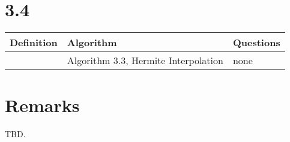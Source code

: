 \documentclass{article}
\begin{document}
\section*{3.4}

\begin{tabularx}{\textwidth}{ |X|X|X| }
    \hline
	{\bf Definition} & {\bf Algorithm} & {\bf Questions} \\
    \hline
	 & Algorithm 3.3, Hermite Interpolation & none \\
    \hline
\end{tabularx}

\section*{Remarks}

TBD.
\end{document}
